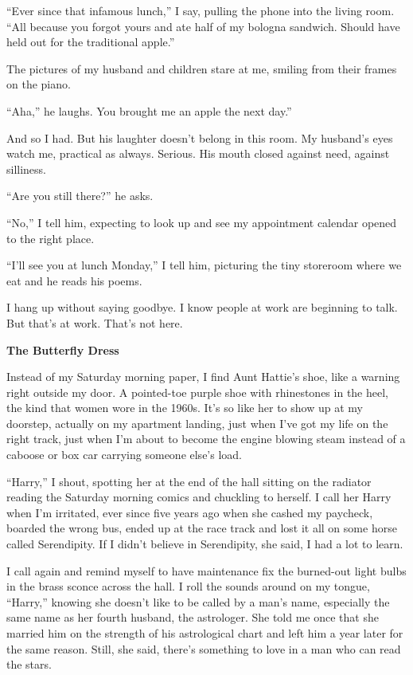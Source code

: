 \documentclass[
]{article}
\begin{document}
``Ever since that infamous lunch,'' I say, pulling the phone into the
living room. ``All because you forgot yours and ate half of my bologna
sandwich. Should have held out for the traditional apple.''

The pictures of my husband and children stare at me, smiling from their
frames on the piano.

``Aha,'' he laughs. You brought me an apple the next day.''

And so I had. But his laughter doesn't belong in this room. My husband's
eyes watch me, prac­tical as always. Serious. His mouth closed against
need, against silliness.

``Are you still there?'' he asks.

``No,'' I tell him, expecting to look up and see my appointment calendar
opened to the right place.

``I'll see you at lunch Monday,'' I tell him, picturing the tiny
storeroom where we eat and he reads his poems.

I hang up without saying goodbye. I know people at work are beginning to
talk. But that's at work. That's not here.

\textbf{\hfill\break
}

\textbf{The Butterfly Dress}

Instead of my Saturday morning paper, I find Aunt Hattie's shoe, like a
warning right outside my door. A pointed-toe purple shoe with
rhinestones in the heel, the kind that women wore in the 1960s. It's so
like her to show up at my doorstep, actually on my apartment landing,
just when I've got my life on the right track, just when I'm about to
become the engine blowing steam instead of a caboose or box car carrying
someone else's load.

``Harry,'' I shout, spotting her at the end of the hall sitting on the
radiator reading the Saturday morning comics and chuckling to herself. I
call her Harry when I'm irritated, ever since five years ago when she
cashed my paycheck, boarded the wrong bus, ended up at the race track
and lost it all on some horse called Serendipity. If I didn't believe in
Serendipity, she said, I had a lot to learn.

I call again and remind myself to have maintenance fix the burned-out
light bulbs in the brass sconce across the hall. I roll the sounds
around on my tongue, ``Harry,'' knowing she doesn't like to be called by
a man's name, especially the same name as her fourth husband, the
astrologer. She told me once that she married him on the strength of his
astrological chart and left him a year later for the same reason. Still,
she said, there's something to love in a man who can read the stars.
\end{document}

